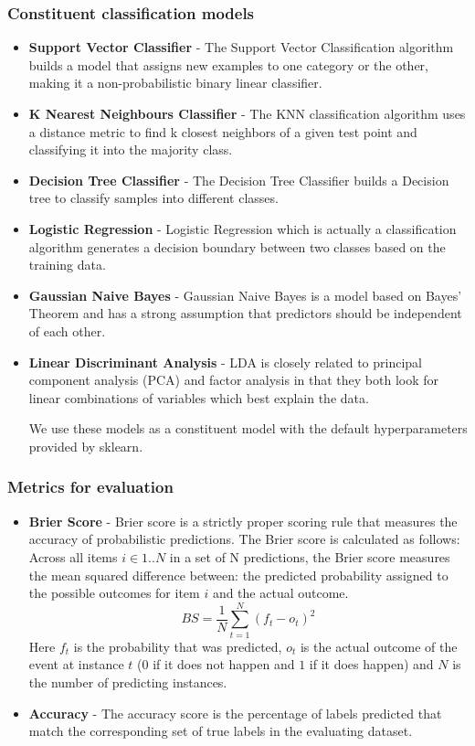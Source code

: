 \documentclass[13pt]{article}
\begin{document}
\subsubsection{Constituent classification models}
\hspace{0.5cm}\begin{itemize}
    \item \textbf{Support Vector Classifier} - The Support Vector Classification algorithm builds a model that assigns new examples to one category or the other, making it a non-probabilistic binary linear classifier.
    \item \textbf{K Nearest Neighbours Classifier} - The KNN classification algorithm uses a distance metric to find k closest neighbors of a given test point and classifying it into the majority class.
    \item \textbf{Decision Tree Classifier} - The Decision Tree Classifier builds a Decision tree to classify samples into different classes.
    \item \textbf{Logistic Regression} - Logistic Regression which is actually a classification algorithm generates a decision boundary between two classes based on the training data.
    \item \textbf{Gaussian Naive Bayes} - Gaussian Naive Bayes is a model based on Bayes’ Theorem and has a strong assumption that predictors should be independent of each other. 
    \item \textbf{Linear Discriminant Analysis} - LDA is closely related to principal component analysis (PCA) and factor analysis in that they both look for linear combinations of variables which best explain the data.
    
We use these models as a constituent model with the default hyperparameters provided by sklearn.
\end{itemize}
\subsubsection{Metrics for evaluation}
\begin{itemize}
    \item \textbf{Brier Score} - Brier score is a strictly proper scoring rule that measures the accuracy of probabilistic predictions. The Brier score is calculated as follows:
    Across all items $i \in 1..N$ in a set of N predictions, the Brier score measures the mean squared difference between: the predicted probability assigned to the possible outcomes for item $i$ and the actual outcome.
    $$BS = \frac{1}{N}\sum\limits _{t=1}^{N}(f_t-o_t)^2 $$
    Here $f_{t}$ is the probability that was predicted, $o_{t}$ is the actual outcome of the event at instance $t$ ($0$ if it does not happen and $1$ if it does happen) and $N$ is the number of predicting instances. 
    \item \textbf{Accuracy} - The accuracy score is the percentage of labels predicted that match the corresponding set of true labels in the evaluating dataset.


\end{itemize}
\end{document}
